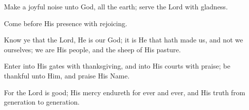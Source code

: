 Make a joyful noise unto God, all the earth; serve the Lord with gladness.

Come before His presence with rejoicing.

Know ye that the Lord, He is our God; it is He that hath made us, and not we ourselves; we are His people, and the sheep of His pasture.

Enter into His gates with thanksgiving, and into His courts with praise; be thankful unto Him, and praise His Name.

For the Lord is good; His mercy endureth for ever and ever, and His truth from generation to generation.
